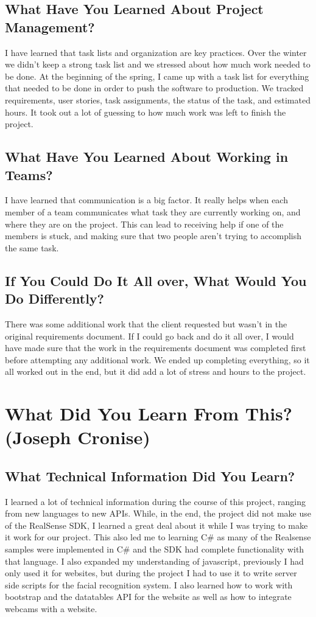 \documentclass[10pt, onecolumn, twoside, peerreview]{IEEEtran}
\begin{document}
\subsection{What Have You Learned About Project Management?}
I have learned that task lists and organization are key practices. Over the winter we didn't keep a strong task list and we stressed about how much work needed to be done. At the beginning of the spring, I came up with a task list for everything that needed to be done in order to push the software to production. We tracked requirements, user stories, task assignments, the status of the task, and estimated hours. It took out a lot of guessing to how much work was left to finish the project.

\subsection{What Have You Learned About Working in Teams?}
I have learned that communication is a big factor. It really helps when each member of a team communicates what task they are currently working on, and where they are on the project. This can lead to receiving help if one of the members is stuck, and making sure that two people aren't trying to accomplish the same task.

\subsection{If You Could Do It All over, What Would You Do Differently?}
There was some additional work that the client requested but wasn't in the original requirements document. If I could go back and do it all over, I would have made sure that the work in the requirements document was completed first before attempting any additional work. We ended up completing everything, so it all worked out in the end, but it did add a lot of stress and hours to the project.


\section{What Did You Learn From This? (Joseph Cronise)}
\subsection{What Technical Information Did You Learn?}
I learned a lot of technical information during the course of this project, ranging from new languages to new APIs. While, in the end, the project did not make use of the RealSense SDK, I learned a great deal about it while I was trying to make it work for our project. This also led me to learning C\# as many of the Realsense samples were implemented in C\# and the SDK had complete functionality with that language. I also expanded my understanding of javascript, previously I had only used it for websites, but during the project I had to use it to write server side scripts for the facial recognition system. I also learned how to work with bootstrap and the datatables API for the website as well as how to integrate webcams with a website.
\end{document}
